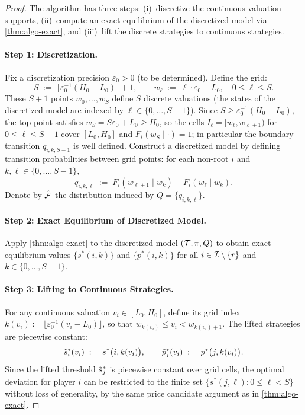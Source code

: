 \begin{proof}
The algorithm has three steps: (i)~discretize the continuous valuation supports, (ii)~compute an exact equilibrium of the discretized model via \cref{thm:algo-exact}, and (iii)~lift the discrete strategies to continuous strategies.

\paragraph{Step 1: Discretization.}
Fix a discretization precision $\varepsilon_0 > 0$ (to be determined). Define the grid:
\[
S \;:=\; \big\lfloor \varepsilon_0^{-1}(H_0 - L_0)\big\rfloor + 1, \qquad w_\ell \;:=\; \ell \cdot \varepsilon_0 + L_0,\quad 0 \le \ell \le S.
\]
These $S+1$ points $w_0, \ldots, w_S$ define $S$ discrete valuations (the states of the discretized model are indexed by $\ell \in \{0,\ldots,S-1\}$). Since $S \ge \varepsilon_0^{-1}(H_0 - L_0)$, the top point satisfies $w_S = S\varepsilon_0 + L_0 \ge H_0$, so the cells $I_\ell = [w_\ell, w_{\ell+1})$ for $0 \le \ell \le S-1$ cover $[L_0, H_0]$ and $F_i(w_S \mid \cdot) = 1$; in particular the boundary transition $q_{i,k,S-1}$ is well defined. Construct a discretized model by defining transition probabilities between grid points: for each non-root $i$ and $k, \ell \in \{0, \ldots, S-1\}$,
\[
q_{i,k,\ell} \;:=\; F_i(w_{\ell+1} \mid w_k) - F_i(w_\ell \mid w_k).
\]
Denote by $\hat{\mathcal{F}}$ the distribution induced by $Q = \{q_{i,k,\ell}\}$.

\paragraph{Step 2: Exact Equilibrium of Discretized Model.}
Apply \cref{thm:algo-exact} to the discretized model $(\mathcal{T}, \pi, Q)$ to obtain exact equilibrium values $\{s^*(i,k)\}$ and $\{p^*(i,k)\}$ for all $i \in \mathcal{I} \setminus \{r\}$ and $k \in \{0,\ldots,S-1\}$.

\paragraph{Step 3: Lifting to Continuous Strategies.}
For any continuous valuation $v_i \in [L_0, H_0]$, define its grid index $k(v_i) := \lfloor \varepsilon_0^{-1}(v_i - L_0)\rfloor$, so that $w_{k(v_i)} \le v_i < w_{k(v_i)+1}$. The lifted strategies are piecewise constant:
\[
\tilde{s}^*_i(v_i) \;:=\; s^*\big(i, k(v_i)\big), \qquad \tilde{p}^*_j(v_i) \;:=\; p^*\big(j, k(v_i)\big).
\]
Since the lifted threshold $\tilde{s}^*_j$ is piecewise constant over grid cells, the optimal deviation for player $i$ can be restricted to the finite set $\{s^*(j,\ell) : 0 \le \ell < S\}$ without loss of generality, by the same price candidate argument as in \cref{thm:algo-exact}.


\end{proof}
